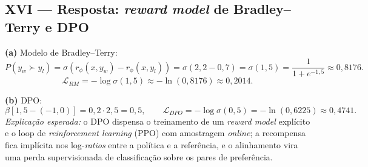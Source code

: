 \documentclass{dlproblemset}
\begin{document}
\subsection*{XVI — Resposta: \textit{reward model} de Bradley--Terry e DPO}
\textbf{(a)} Modelo de Bradley--Terry:
\[
P(y_w \succ y_l) = \sigma\!\left(r_\phi(x, y_w) - r_\phi(x, y_l)\right) = \sigma(2{,}2 - 0{,}7) = \sigma(1{,}5) = \frac{1}{1 + e^{-1{,}5}} \approx 0{,}8176.
\]
\[
\mathcal{L}_{RM} = -\log \sigma(1{,}5) \approx -\ln(0{,}8176) \approx 0{,}2014.
\]

\textbf{(b)} DPO:
\[
\beta\left[1{,}5 - (-1{,}0)\right] = 0{,}2 \cdot 2{,}5 = 0{,}5, \qquad
\mathcal{L}_{DPO} = -\log \sigma(0{,}5) = -\ln(0{,}6225) \approx 0{,}4741.
\]
\textit{Explicação esperada:} o DPO dispensa o treinamento de um \textit{reward model}
explícito e o loop de \textit{reinforcement learning} (PPO) com amostragem
\textit{online}; a recompensa fica implícita nos log-\textit{ratios} entre a política e
a referência, e o alinhamento vira uma perda supervisionada de classificação sobre os
pares de preferência.
\end{document}
